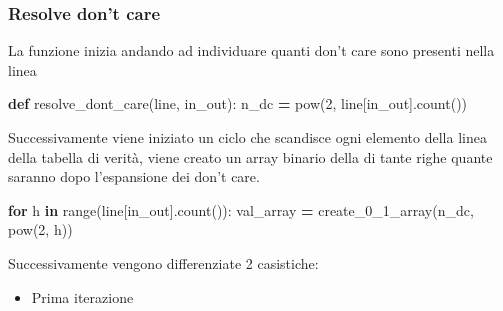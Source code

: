 \documentclass[
]{book}
\newenvironment{Shaded}{\begin{snugshade}}{\end{snugshade}}
\newcommand{\BuiltInTok}[1]{#1}
\newcommand{\ControlFlowTok}[1]{\textcolor[rgb]{0.13,0.29,0.53}{\textbf{#1}}}
\newcommand{\DecValTok}[1]{\textcolor[rgb]{0.00,0.00,0.81}{#1}}
\newcommand{\KeywordTok}[1]{\textcolor[rgb]{0.13,0.29,0.53}{\textbf{#1}}}
\newcommand{\NormalTok}[1]{#1}
\newcommand{\OperatorTok}[1]{\textcolor[rgb]{0.81,0.36,0.00}{\textbf{#1}}}
\newcommand{\StringTok}[1]{\textcolor[rgb]{0.31,0.60,0.02}{#1}}
\providecommand{\tightlist}{%
  \setlength{\itemsep}{0pt}\setlength{\parskip}{0pt}}
\begin{document}
\hypertarget{resolve-dont-care}{%
\subsubsection{Resolve don't care}\label{resolve-dont-care}}

La funzione inizia andando ad individuare quanti don't care sono presenti nella linea

\begin{Shaded}
\begin{Highlighting}[]
\KeywordTok{def}\NormalTok{ resolve\_dont\_care(line, in\_out):}
\NormalTok{  n\_dc }\OperatorTok{=} \BuiltInTok{pow}\NormalTok{(}\DecValTok{2}\NormalTok{, line[in\_out].count(}\StringTok{\textquotesingle{}{-}\textquotesingle{}}\NormalTok{))}
\end{Highlighting}
\end{Shaded}

\newpage

Successivamente viene iniziato un ciclo che scandisce ogni elemento della linea della tabella di verità, viene creato un array binario della di tante righe quante saranno dopo l'espansione dei don't care.

\begin{Shaded}
\begin{Highlighting}[]
\ControlFlowTok{for}\NormalTok{ h }\KeywordTok{in} \BuiltInTok{range}\NormalTok{(line[in\_out].count(}\StringTok{\textquotesingle{}{-}\textquotesingle{}}\NormalTok{)):}
\NormalTok{  val\_array }\OperatorTok{=}\NormalTok{ create\_0\_1\_array(n\_dc, }\BuiltInTok{pow}\NormalTok{(}\DecValTok{2}\NormalTok{, h))}
\end{Highlighting}
\end{Shaded}

Successivamente vengono differenziate 2 casistiche:

\begin{itemize}
\tightlist
\item
  Prima iterazione
\end{itemize}
\end{document}
